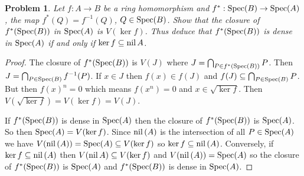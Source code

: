 \documentclass{article}
\newcommand{\spec}{\textup{Spec}}
\newcommand{\nil}{\textup{nil}\,}
\newtheorem{problem}{Problem}
\begin{document}
\begin{problem}
Let $f : A \to B$ be a ring homomorphism and $f^* : \spec(B) \to \spec(A)$, the map $f^*(Q) = f^{-1}(Q)$, $Q \in \spec(B)$. Show that the closure of $f^*(\spec(B))$ in $\spec(A)$ is $V(\ker f)$. Thus deduce that $f^*(\spec(B))$ is dense in $\spec(A)$ if and only if $\ker f \subseteq \nil A$.
\end{problem}
\begin{proof}
The closure of $f^*(\spec(B))$ is $V(J)$ where $J = \bigcap_{P \in f^*(\spec(B))} P$. Then $J = \bigcap_{P \in \spec(B)} f^{-1}(P)$. If $x \in J$ then $f(x) \in f(J)$ and $f(J) \subseteq \bigcap_{P \in \spec(B)} P$. But then $f(x)^n = 0$ which means $f(x^n) = 0$ and $x \in \sqrt{\ker f}$. Then $V(\sqrt{\ker f}) = V(\ker f) = V(J)$.

If $f^*(\spec(B))$ is dense in $\spec(A)$ then the closure of $f^*(\spec(B))$ is $\spec(A)$. So then $\spec(A) = V(\ker f)$. Since $\nil(A)$ is the intersection of all $P \in \spec(A)$ we have $V(\nil(A)) = \spec(A) \subseteq V(\ker f)$ so $\ker f \subseteq \nil(A)$. Conversely, if $\ker f \subseteq \nil(A)$ then $V(\nil A) \subseteq V(\ker f)$ and $V(\nil(A)) = \spec(A)$ so the closure of $f^*(\spec(B))$ is $\spec(A)$ and $f^*(\spec(B))$ is dense in $\spec(A)$.
\end{proof}
\end{document}
